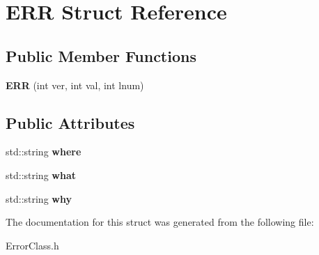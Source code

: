 \hypertarget{structERR}{}\section{E\+RR Struct Reference}
\label{structERR}
\subsection*{Public Member Functions}
\begin{DoxyCompactItemize}
\item 
\mbox{\label{structERR_aa82d4e98aa53d95540e497640be6b308}} 
{\bfseries E\+RR} (int ver, int val, int lnum)
\end{DoxyCompactItemize}
\subsection*{Public Attributes}
\begin{DoxyCompactItemize}
\item 
\mbox{\label{structERR_a578e3fd7c0cd715eb186820362e249ce}} 
std\+::string {\bfseries where}
\item 
\mbox{\label{structERR_a5965dafe49fecfceb2114977dc61c4b3}} 
std\+::string {\bfseries what}
\item 
\mbox{\label{structERR_a26f08f1380a018bc7c204e9779cc14e7}} 
std\+::string {\bfseries why}
\end{DoxyCompactItemize}


The documentation for this struct was generated from the following file\+:\begin{DoxyCompactItemize}
\item 
Error\+Class.\+h\end{DoxyCompactItemize}
